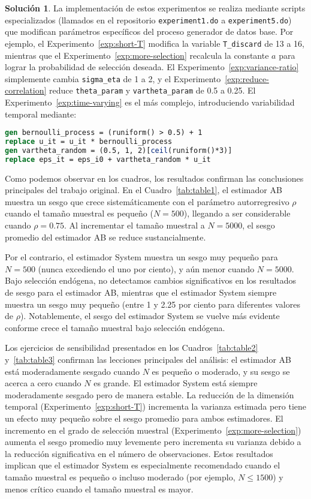\documentclass[12pt,letterpaper,reqno,oneside]{amsart}
\theoremstyle{problemstyle} %
\theoremstyle{definition} %
\newtheorem{solution}{Solución}[problem]
\begin{document}
\begin{solution}
  La implementación de estos experimentos se realiza mediante scripts especializados (llamados en el repositorio \texttt{experiment1.do} a \texttt{experiment5.do}) que modifican parámetros específicos del proceso generador de datos base.
  Por ejemplo, el Experimento~\ref{exp:short-T} modifica la variable \texttt{T\_discard} de 13 a 16, mientras que el Experimento~\ref{exp:more-selection} recalcula la constante $a$ para lograr la probabilidad de selección deseada.
  El Experimento~\ref{exp:variance-ratio} simplemente cambia \texttt{sigma\_eta} de 1 a 2, y el Experimento~\ref{exp:reduce-correlation} reduce \texttt{theta\_param} y \texttt{vartheta\_param} de 0.5 a 0.25.
  El Experimento~\ref{exp:time-varying} es el más complejo, introduciendo variabilidad temporal mediante:
  \begin{lstlisting}[language=Stata, basicstyle=\ttfamily]
gen bernoulli_process = (runiform() > 0.5) + 1
replace u_it = u_it * bernoulli_process
gen vartheta_random = (0.5, 1, 2)[ceil(runiform()*3)]
replace eps_it = eps_i0 + vartheta_random * u_it
\end{lstlisting}

  Como podemos observar en los cuadros, los resultados confirman las conclusiones principales del trabajo original.
  En el Cuadro~\ref{tab:table1}, el estimador AB muestra un sesgo que crece sistemáticamente con el parámetro autorregresivo $\rho$ cuando el tamaño muestral es pequeño ($N = 500$), llegando a ser considerable cuando $\rho = 0.75$.
  Al incrementar el tamaño muestral a $N = 5000$, el sesgo promedio del estimador AB se reduce sustancialmente.

  Por el contrario, el estimador System muestra un sesgo muy pequeño para $N = 500$ (nunca excediendo el uno por ciento), y aún menor cuando $N = 5000$.
  Bajo selección endógena, no detectamos cambios significativos en los resultados de sesgo para el estimador AB, mientras que el estimador System siempre muestra un sesgo muy pequeño (entre 1 y 2.25 por ciento para diferentes valores de $\rho$).
  Notablemente, el sesgo del estimador System se vuelve más evidente conforme crece el tamaño muestral bajo selección endógena.

  Los ejercicios de sensibilidad presentados en los Cuadros~\ref{tab:table2} y~\ref{tab:table3} confirman las lecciones principales del análisis: el estimador AB está moderadamente sesgado cuando $N$ es pequeño o moderado, y su sesgo se acerca a cero cuando $N$ es grande.
  El estimador System está siempre moderadamente sesgado pero de manera estable.
  La reducción de la dimensión temporal (Experimento~\ref{exp:short-T}) incrementa la varianza estimada pero tiene un efecto muy pequeño sobre el sesgo promedio para ambos estimadores.
  El incremento en el grado de selección muestral (Experimento~\ref{exp:more-selection}) aumenta el sesgo promedio muy levemente pero incrementa su varianza debido a la reducción significativa en el número de observaciones.
  Estos resultados implican que el estimador System es especialmente recomendado cuando el tamaño muestral es pequeño o incluso moderado (por ejemplo, $N \leq 1500$) y menos crítico cuando el tamaño muestral es mayor.


\end{solution}
\end{document}
